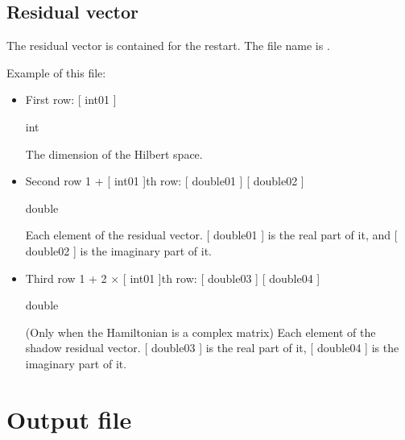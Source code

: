 \documentclass[letterpaper,10pt,dvipdfmx,openany,english]{sphinxmanual}
\begin{document}
\subsection{Residual vector}
\label{\detokenize{shiftk_format_en:residual-vector}}\label{\detokenize{shiftk_format_en:revec}}
The residual vector is contained for the restart.
The file name is .

Example of this file:

\begin{sphinxVerbatim}[commandchars=\\\{\}]
 
 
 
 
   
\end{sphinxVerbatim}
\begin{itemize}
\item {} 
First row: {[} int01 {]}

 int

 The dimension of the Hilbert space.

\item {} 
Second row \sphinxhyphen{} 1 + {[} int01 {]}th row:
{[} double01 {]} {[} double02 {]}

 double

 Each element of the residual vector.
{[} double01 {]} is the real part of it, and
{[} double02 {]} is the imaginary part of it.

\item {} 
Third row \sphinxhyphen{} 1 + 2 \(\times\) {[} int01 {]}th row:
{[} double03 {]} {[} double04 {]}

 double

(Only when the Hamiltonian is a complex matrix)
Each element of the shadow residual vector.
{[} double03 {]} is the real part of it,
{[} double04 {]} is the imaginary part of it.

\end{itemize}


\section{Output file}
\label{\detokenize{shiftk_format_en:output-file}}
\end{document}
